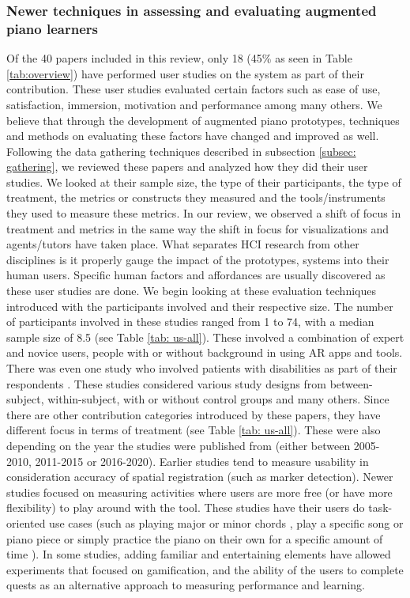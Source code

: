 \documentclass[sigconf, screen, review]{acmart}
\begin{document}
\subsubsection{Newer techniques in assessing and evaluating augmented piano learners}
\label{subsec: eval}
Of the 40 papers included in this review, only 18 (45\% as seen in Table \ref{tab:overview}) have performed user studies on the system  as part of their contribution. These user studies evaluated certain factors such as ease of use, satisfaction, immersion, motivation and performance among many others. We believe that through the development of augmented piano prototypes, techniques and methods on evaluating these factors have changed and improved as well. Following the data gathering techniques described in subsection \ref{subsec: gathering}, we reviewed these papers and analyzed how they did their user studies. We looked at their sample size, the type of their participants, the type of treatment, the metrics or constructs they measured and the tools/instruments they used to measure these metrics. In our review, we observed a shift of focus in treatment and metrics in the same way the shift in focus for visualizations and agents/tutors have taken place. 
What separates HCI research from other disciplines is it properly gauge the impact of the prototypes, systems into their human users. Specific human factors and affordances are usually discovered as these user studies are done. We begin looking at these evaluation techniques introduced with the participants involved and their respective size. The number of participants involved in these studies ranged from 1 to 74, with a median sample size of 8.5 (see Table \ref{tab: us-all}). These involved a combination of expert and novice users, people with or without background in using AR apps and tools. There was even one study who involved patients with disabilities as part of their respondents \cite{correa2009computer}. These studies considered various study designs from between-subject, within-subject, with or without control groups and many others. Since there are other contribution categories introduced by these papers, they have different focus in terms of treatment (see Table \ref{tab: us-all}). These were also depending on the year the studies were published from (either between 2005-2010, 2011-2015 or 2016-2020). Earlier studies tend to measure usability in consideration accuracy of spatial registration (such as marker detection). Newer studies focused on measuring activities where users are more free (or have more flexibility) to play around with the tool. These studies have their users do task-oriented use cases (such as playing major or minor chords \cite{nugraha2014pemanfaatan, xiao2010mirrorfugue}, play a specific song or piano piece \cite{chow2013music, sandnes2019enhanced,pan2018pilot} or simply practice the piano on their own for a specific amount of time \cite{weing2013piano, raymaekers2014game}). In some studies, adding familiar and entertaining elements have allowed experiments that focused on gamification, and the ability of the users to complete quests as an alternative approach to measuring performance and learning. 
\end{document}
